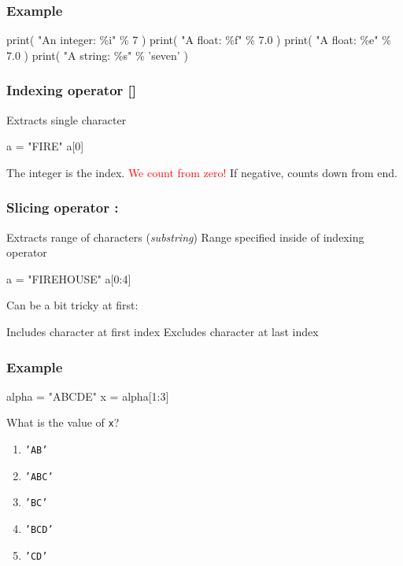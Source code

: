 \documentclass[11pt]{beamer}
\begin{document}
\begin{frame}[fragile]
  \frametitle{Example}
  \Enlarge

  \begin{semiverbatim}
print( "An integer:  \%i" \% 7 )
print( "A float:     \%f" \% 7.0 )
print( "A float:     \%e" \% 7.0 )
print( "A string:    \%s" \% 'seven' )
  \end{semiverbatim}
\end{frame}

\begin{frame}[fragile]
  \frametitle{Indexing operator \textbf{[]}}
  \Enlarge

  \begin{itemize}
  \myitem  Extracts single character
\begin{semiverbatim}
a = "FIRE"
a[0]
\end{semiverbatim}
  \myitem  The integer is the index.
  \myitem  \textcolor{red}{We count from zero!}
  \myitem  If negative, counts down from end.
  \end{itemize}
\end{frame}

\begin{frame}[fragile]
  \frametitle{Slicing operator \textbf{:}}
  \Enlarge

  \begin{itemize}
  \myitem  Extracts range of characters (\emph{substring}) \pause
  \myitem  Range specified inside of indexing operator \pause
\begin{semiverbatim}
a = "FIREHOUSE"
a[0:4]
\end{semiverbatim} \pause
  \myitem  Can be a bit tricky at first:
    \begin{itemize}
    \mysubitem  Includes character at first index
    \mysubitem  Excludes character at last index
    \end{itemize}
  \end{itemize}
\end{frame}

\begin{frame}[fragile]
  \frametitle{Example}
  \Enlarge

  \begin{semiverbatim}
alpha = "ABCDE"
x = alpha[1:3]
  \end{semiverbatim}
  What is the value of \texttt{x}?
  \begin{enumerate}[label=\Alph*]
  \item  \texttt{'AB'}
  \item  \texttt{'ABC'}
  \item  \texttt{'BC'}
  \item  \texttt{'BCD'}
  \item  \texttt{'CD'}
  \end{enumerate}
\end{frame}
\end{document}
